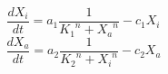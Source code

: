 \documentclass[preview]{standalone}
\begin{document}
$$\frac{dX_i}{dt} = a_1 \frac{1}{{K_1}^n+{X_a}^n} - c_1 X_i $$
$$\frac{dX_a}{dt} = a_2 \frac{1}{{K_2}^n+{X_i}^n} - c_2 X_a $$
\end{document}

